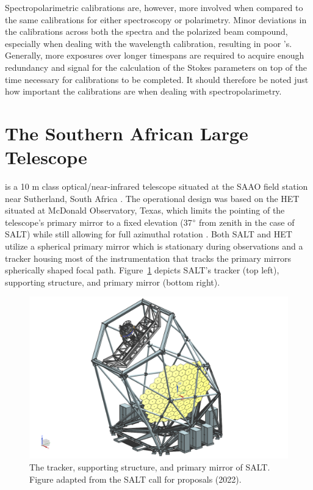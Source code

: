 Spectropolarimetric calibrations are, however, more involved when compared to the same calibrations for either spectroscopy or polarimetry. Minor deviations in the calibrations across both the spectra and the polarized beam compound, especially when dealing with the wavelength calibration, resulting in poor 's. Generally, more exposures over longer timespans are required to acquire enough redundancy and signal for the calculation of the Stokes parameters on top of the time necessary for calibrations to be completed. It should therefore be noted just how important the calibrations are when dealing with spectropolarimetry.

\section{The Southern African Large Telescope} \label{sec:SALT} %

 is a 10 m class optical/near-infrared telescope situated at the \gls{SAAO} field station near Sutherland, South Africa \citep{SALT_optical_design}. The operational design was based on the \gls{HET} situated at McDonald Observatory, Texas, which limits the pointing of the telescope's primary mirror to a fixed elevation (37$\degree$ from zenith in the case of SALT) while still allowing for full azimuthal rotation \citep{HET}. Both SALT and HET utilize a spherical primary mirror which is stationary during observations and a tracker housing most of the instrumentation that tracks the primary mirrors spherically shaped focal path. Figure~\ref{fig:SALT_telescope} depicts \gls{SALT}'s tracker (top left), supporting structure, and primary mirror (bottom right).

\begin{figure}[t]
    \centering
    \includegraphics[width = 15cm]{figures/2_SALT_telescope.png}
    \caption{The tracker, supporting structure, and primary mirror of SALT. Figure adapted from the SALT call for proposals (2022).\protect\footnotemark}
    \label{fig:SALT_telescope}
\end{figure}

